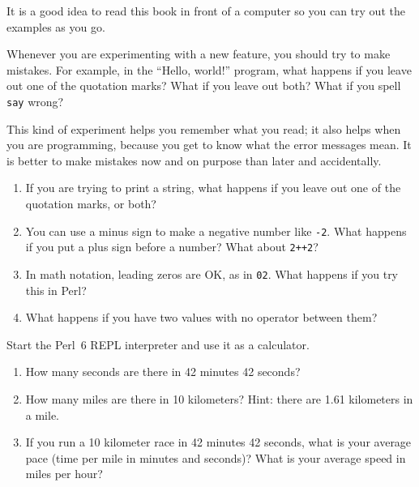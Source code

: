 \begin{exercise}

It is a good idea to read this book in front of a computer so you 
can try out the examples as you go.

Whenever you are experimenting with a new feature, you should try
to make mistakes.  For example, in the ``Hello, world!'' program,
what happens if you leave out one of the quotation marks?  What
if you leave out both?  What if you spell {\tt say} wrong?

This kind of experiment helps you remember what you read; it also
helps when you are programming, because you get to know what the error
messages mean.  It is better to make mistakes now and on purpose than
later and accidentally.

\begin{enumerate}

\item If you are trying to print a string, what happens if you
leave out one of the quotation marks, or both?

\item You can use a minus sign to make a negative number like
{\tt -2}.  What happens if you put a plus sign before a number?
What about {\tt 2++2}?

\item In math notation, leading zeros are OK, as in {\tt 02}.
What happens if you try this in Perl?

\item What happens if you have two values with no operator
between them?

\end{enumerate}

\end{exercise}



\begin{exercise}

Start the Perl~6 REPL interpreter and use it as a calculator.

\begin{enumerate}

\item How many seconds are there in 42 minutes 42 seconds?

\item How many miles are there in 10 kilometers?  Hint: there are 1.61
  kilometers in a mile.

\item If you run a 10 kilometer race in 42 minutes 42 seconds, what is
  your average pace (time per mile in minutes and seconds)?  What is
  your average speed in miles per hour?


\end{enumerate}

\end{exercise}


